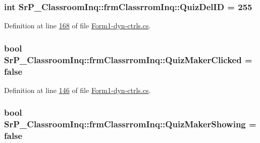 \hypertarget{class_sr_p___classroom_inq_1_1frm_classrrom_inq_a2221a860fdb3bc2837b3ca3c0cee182c}{
\subsubsection[{\-Quiz\-Del\-I\-D}]{\setlength{\rightskip}{0pt plus 5cm}int {\bf \-Sr\-P\-\_\-\-Classroom\-Inq\-::frm\-Classrrom\-Inq\-::\-Quiz\-Del\-I\-D} = 255}}
\label{class_sr_p___classroom_inq_1_1frm_classrrom_inq_a2221a860fdb3bc2837b3ca3c0cee182c}


\-Definition at line \hyperlink{_form1-dyn-ctrls_8cs_source_l00168}{168} of file \hyperlink{_form1-dyn-ctrls_8cs_source}{\-Form1-\/dyn-\/ctrls.\-cs}.

\hypertarget{class_sr_p___classroom_inq_1_1frm_classrrom_inq_a80b43512315939f073e08cfea00ce796}{
\subsubsection[{\-Quiz\-Maker\-Clicked}]{\setlength{\rightskip}{0pt plus 5cm}bool {\bf \-Sr\-P\-\_\-\-Classroom\-Inq\-::frm\-Classrrom\-Inq\-::\-Quiz\-Maker\-Clicked} = false}}
\label{class_sr_p___classroom_inq_1_1frm_classrrom_inq_a80b43512315939f073e08cfea00ce796}


\-Definition at line \hyperlink{_form1-dyn-ctrls_8cs_source_l00146}{146} of file \hyperlink{_form1-dyn-ctrls_8cs_source}{\-Form1-\/dyn-\/ctrls.\-cs}.

\hypertarget{class_sr_p___classroom_inq_1_1frm_classrrom_inq_a527e6e32ab67073ccbdb94297399ab2d}{
\subsubsection[{\-Quiz\-Maker\-Showing}]{\setlength{\rightskip}{0pt plus 5cm}bool {\bf \-Sr\-P\-\_\-\-Classroom\-Inq\-::frm\-Classrrom\-Inq\-::\-Quiz\-Maker\-Showing} = false}}
\label{class_sr_p___classroom_inq_1_1frm_classrrom_inq_a527e6e32ab67073ccbdb94297399ab2d}


